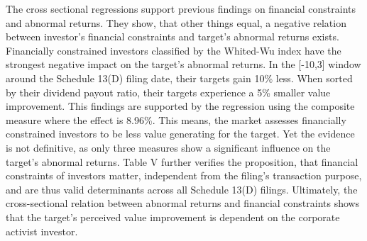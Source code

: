 \documentclass[12pt]{article}
\begin{document}
The cross sectional regressions support previous findings on financial constraints and abnormal returns. They show, that other things equal, a negative relation between investor's financial constraints and target's abnormal returns exists. Financially constrained investors classified by the Whited-Wu index have the strongest negative impact on the target's abnormal returns. In the [-10,3] window around the Schedule 13(D) filing date, their targets gain 10\% less. When sorted by their dividend payout ratio, their targets experience a 5\% smaller value improvement. This findings are supported by the regression using the composite measure where the effect is 8.96\%. This means, the market assesses financially constrained investors to be less value generating for the target. Yet the evidence is not definitive, as only three measures show a significant influence on the target's abnormal returns. Table V further verifies the proposition, that financial constraints of investors matter, independent from the filing's transaction purpose, and are thus valid determinants across all Schedule 13(D) filings. Ultimately, the cross-sectional relation between abnormal returns and financial constraints shows that the target's perceived value improvement is dependent on the corporate activist investor.
\pagebreak
\end{document}
